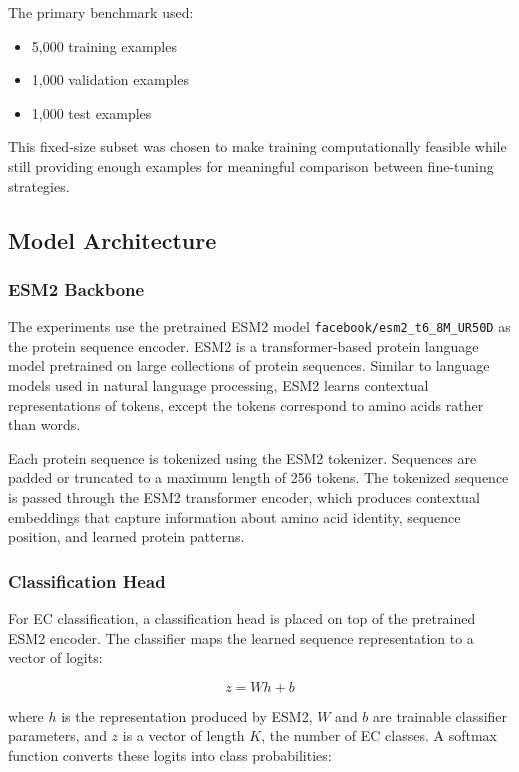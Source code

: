 \documentclass{article}
\begin{document}
The primary benchmark used:
\begin{itemize}
    \item 5,000 training examples
    \item 1,000 validation examples
    \item 1,000 test examples
\end{itemize}

This fixed-size subset was chosen to make training computationally feasible while still providing enough examples for meaningful comparison between fine-tuning strategies.

\subsection{Model Architecture}

\subsubsection{ESM2 Backbone}

The experiments use the pretrained ESM2 model \texttt{facebook/esm2\_t6\_8M\_UR50D} as the protein sequence encoder. ESM2 is a transformer-based protein language model pretrained on large collections of protein sequences. Similar to language models used in natural language processing, ESM2 learns contextual representations of tokens, except the tokens correspond to amino acids rather than words.

Each protein sequence is tokenized using the ESM2 tokenizer. Sequences are padded or truncated to a maximum length of 256 tokens. The tokenized sequence is passed through the ESM2 transformer encoder, which produces contextual embeddings that capture information about amino acid identity, sequence position, and learned protein patterns.

\subsubsection{Classification Head}

For EC classification, a classification head is placed on top of the pretrained ESM2 encoder. The classifier maps the learned sequence representation to a vector of logits:

\[
z = W h + b
\]

where \(h\) is the representation produced by ESM2, \(W\) and \(b\) are trainable classifier parameters, and \(z\) is a vector of length \(K\), the number of EC classes. A softmax function converts these logits into class probabilities:
\end{document}
